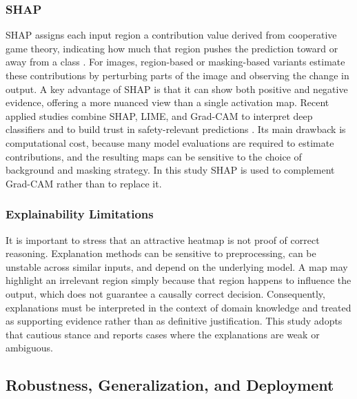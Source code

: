 \documentclass[preprint,12pt]{elsarticle}
\begin{document}
\subsubsection{SHAP}

SHAP assigns each input region a contribution value derived from cooperative game theory, indicating how much that region pushes the prediction toward or away from a class \cite{lundberg2017unified}.
For images, region-based or masking-based variants estimate these contributions by perturbing parts of the image and observing the change in output.
A key advantage of SHAP is that it can show both positive and negative evidence, offering a more nuanced view than a single activation map.
Recent applied studies combine SHAP, LIME, and Grad-CAM to interpret deep classifiers and to build trust in safety-relevant predictions \cite{nazim2025advancing, deshpande2024explainable, mandloi2024explainable}.
Its main drawback is computational cost, because many model evaluations are required to estimate contributions, and the resulting maps can be sensitive to the choice of background and masking strategy.
In this study SHAP is used to complement Grad-CAM rather than to replace it.

\subsubsection{Explainability Limitations}

It is important to stress that an attractive heatmap is not proof of correct reasoning.
Explanation methods can be sensitive to preprocessing, can be unstable across similar inputs, and depend on the underlying model.
A map may highlight an irrelevant region simply because that region happens to influence the output, which does not guarantee a causally correct decision.
Consequently, explanations must be interpreted in the context of domain knowledge and treated as supporting evidence rather than as definitive justification.
This study adopts that cautious stance and reports cases where the explanations are weak or ambiguous.

\subsection{Robustness, Generalization, and Deployment}
\end{document}
